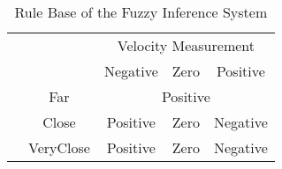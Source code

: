 \documentclass{article}
\begin{document}
\begin{table}
	\begin{center}
	\caption{Rule Base of the Fuzzy Inference System}\label{tab:rulebase}
		\begin{tabular}{c||cccc}
		\multicolumn{2}{c}{} &	\multicolumn{3}{c}{Velocity Measurement} \\\cline{3-5}\cline{3-5}
		&	& Negative	&	Zero	&	Positive	\\\cline{2-5}
		& Far	&	\multicolumn{3}{c}{Positive}	\\
		& Close &	Positive	&	Zero	&	Negative	\\
		& VeryClose &	Positive	&	Zero	&	Negative	\\
		\end{tabular}
	\end{center}
\end{table}
\end{document}
